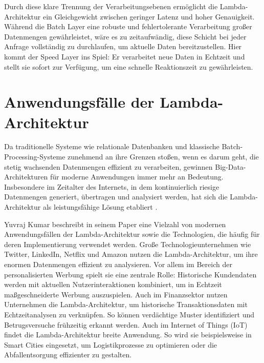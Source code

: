 Durch diese klare Trennung der Verarbeitungsebenen ermöglicht die Lambda-Architektur ein Gleichgewicht zwischen geringer Latenz und hoher Genauigkeit. Während die Batch Layer eine robuste und fehlertolerante Verarbeitung großer Datenmengen gewährleistet, wäre es zu zeitaufwändig, diese Schicht bei jeder Anfrage vollständig zu durchlaufen, um aktuelle Daten bereitzustellen. Hier kommt der Speed Layer ins Spiel: Er verarbeitet neue Daten in Echtzeit und stellt sie sofort zur Verfügung, um eine schnelle Reaktionszeit zu gewährleisten.

\section{Anwendungsfälle der Lambda-Architektur}
Da traditionelle Systeme wie relationale Datenbanken und klassische Batch-Processing-Systeme zunehmend an ihre Grenzen stoßen, wenn es darum geht, die stetig wachsenden Datenmengen effizient zu verarbeiten, gewinnen Big-Data-Architekturen für moderne Anwendungen immer mehr an Bedeutung. Insbesondere im Zeitalter des Internets, in dem kontinuierlich riesige Datenmengen generiert, übertragen und analysiert werden, hat sich die Lambda-Architektur als leistungsfähige Lösung etabliert \cite{kumar2020lambda,kiran2015lambda,katkar2015study}.

Yuvraj Kumar \cite{kumar2020lambda} beschreibt in seinem Paper eine Vielzahl von modernen Anwendungsfällen der Lambda-Architektur sowie die Technologien, die häufig für deren Implementierung verwendet werden. Große Technologieunternehmen wie Twitter, LinkedIn, Netflix und Amazon nutzen die Lambda-Architektur, um ihre enormen Datenmengen effizient zu analysieren. Vor allem im Bereich der personalisierten Werbung spielt sie eine zentrale Rolle: Historische Kundendaten werden mit aktuellen Nutzerinteraktionen kombiniert, um in Echtzeit maßgeschneiderte Werbung auszuspielen.
Auch im Finanzsektor nutzen Unternehmen die Lambda-Architektur, um historische Transaktionsdaten mit Echtzeitanalysen zu verknüpfen. So können verdächtige Muster identifiziert und Betrugsversuche frühzeitig erkannt werden. Auch im Internet of Things (IoT) findet die Lambda-Architektur breite Anwendung. So wird sie beispielsweise in Smart Cities eingesetzt, um Logistikprozesse zu optimieren oder die Abfallentsorgung effizienter zu gestalten.


